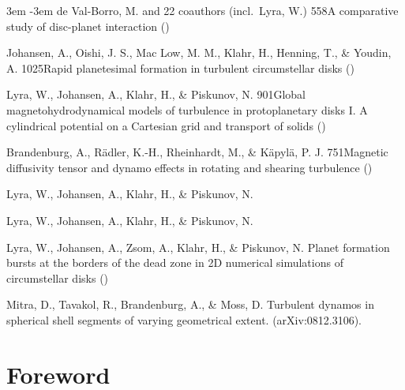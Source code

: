 \documentclass[\mydriver,12pt,twoside,notitlepage,a4paper]{article}
\begin{document}
\begin{list}{}{\leftmargin 3em \itemindent -3em\listparindent \itemindent
\itemsep 0pt \parsep 1pt}
de Val-Borro, M. and 22 coauthors (incl.\ Lyra, W.)
{558}{A comparative study of disc-planet interaction}
()

Johansen, A., Oishi, J. S., Mac Low, M. M., Klahr, H., Henning, T.,
\& Youdin, A.
{1025}{Rapid planetesimal formation in turbulent circumstellar disks}
()

Lyra, W., Johansen, A., Klahr, H., \& Piskunov, N.
{901}{Global magnetohydrodynamical models of turbulence in protoplanetary disks I. A cylindrical potential on a Cartesian grid and transport of solids}
()

Brandenburg, A., R\"adler, K.-H., Rheinhardt, M., \& K\"apyl\"a, P. J.
{751}{Magnetic diffusivity tensor and dynamo effects in rotating
and shearing turbulence}
()

Lyra, W., Johansen, A., Klahr, H., \& Piskunov, N.

Lyra, W., Johansen, A., Klahr, H., \& Piskunov, N.

Lyra, W., Johansen, A., Zsom, A., Klahr, H., \& Piskunov, N.
{Planet formation bursts at the borders of the dead zone in 2D numerical simulations of circumstellar disks}
()

Mitra, D., Tavakol, R., Brandenburg, A., \& Moss, D.
{Turbulent dynamos in spherical shell segments of varying geometrical
 extent.}
(arXiv:0812.3106).
\end{list}

\clearpage


\section*{Foreword}
\end{document}
